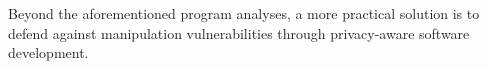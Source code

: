 {Beyond the aforementioned program analyses, a more practical solution is to defend against manipulation vulnerabilities through privacy-aware software development.}



